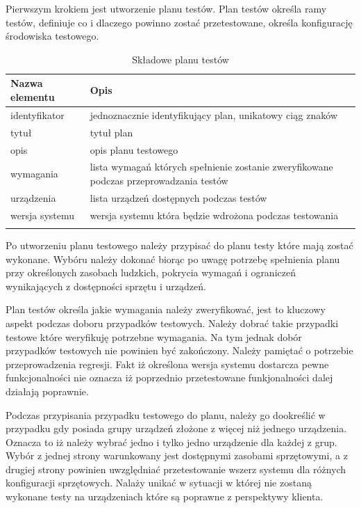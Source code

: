 Pierwszym krokiem jest utworzenie planu testów. Plan testów określa ramy testów, definiuje co i dlaczego powinno zostać przetestowane, określa konfigurację środowiska testowego.

\begin{longtable}{| p{6cm}  | p{10cm} |}
 \hline \hline
\textbf{Nazwa elementu} & \textbf{Opis}  \\ \hline
  identyfikator & jednoznacznie identyfikujący plan, unikatowy ciąg znaków \\ \hline
  tytuł & tytuł plan \\ \hline
  opis & opis planu testowego \\ \hline
  wymagania & lista wymagań których spełnienie zostanie zweryfikowane podczas przeprowadzania testów \\ \hline
  urządzenia & lista urządzeń dostępnych podczas testów \\ \hline
  wersja systemu & wersja systemu która będzie wdrożona podczas testowania  \\ \hline
 \caption{ Składowe planu testów}
\end{longtable}



Po utworzeniu planu testowego należy przypisać do planu testy które mają zostać wykonane. Wybóru należy dokonać biorąc po uwagę potrzebę spełnienia planu przy określonych zasobach ludzkich, pokrycia wymagań i ograniczeń wynikających z dostępności sprzętu i urządzeń.

Plan testów określa jakie wymagania należy zweryfikować, jest to kluczowy aspekt podczas doboru przypadków testowych. Należy dobrać takie przypadki testowe które weryfikuję potrzebne wymagania. Na tym jednak dobór przypadków testowych nie powinien być zakończony. Należy pamiętać o potrzebie przeprowadzenia regresji. Fakt iż określona wersja systemu dostarcza pewne funkcjonalności nie oznacza iż poprzednio przetestowane funkjonalności dalej działają poprawnie.

Podczas przypisania przypadku testowego do planu, należy go dookreślić w przypadku gdy posiada grupy urządzeń złożone z więcej niż jednego urządzenia. Oznacza to iż należy wybrać jedno i tylko jedno urządzenie dla każdej z grup. Wybór z jednej strony warunkowany jest dostępnymi zasobami sprzętowymi, a z drugiej strony powinien uwzględniać przetestowanie wszerz systemu dla różnych konfiguracji sprzętowych. Nalaży unikać w sytuacji w której nie zostaną wykonane testy na urządzeniach które są poprawne z perspektywy klienta.

